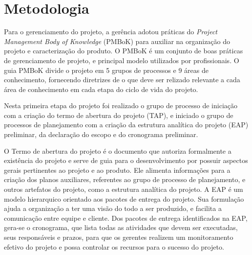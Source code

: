 \section{Metodologia}

  Para o gerenciamento do projeto, a gerência adotou práticas do \textit{Project Management Body of Knowledge}
  (PMBoK) para auxiliar na organização do projeto e caracterização do produto.
  O PMBoK é um conjunto de boas práticas de gerenciamento de projeto, e principal modelo
  utilizados por profissionais. O guia PMBoK divide o projeto em 5 grupos de processos e
  9 áreas de conhecimento, fornecendo diretrizes de o que deve ser relizado relevante
  a cada área de conhecimento em cada etapa do ciclo de vida do projeto.

  Nesta primeira etapa do projeto foi realizado o grupo de
  processo de iniciação com a criação do termo de abertura
  do projeto (TAP), e iniciado o grupo de processos de planejamento
  com a criação da estrutura analítica do projeto (EAP) preliminar, da
  declaração do escopo e do cronograma preliminar.

  O Termo de abertura do projeto é o documento que autoriza formalmente a existência
  do projeto e serve de guia para o desenvolvimento por possuir aspectos gerais
  pertinentes ao projeto e ao produto. Ele alimenta informações para a criação dos planos
   auxiliares, referentes ao grupo de processo de planejamento, e outros artefatos do projeto, como
   a estrutura analítica do projeto.
   A EAP é um modelo hierarquico orientado aos pacotes de entrega do projeto. Sua formulação
   ajuda a organização a ter uma visão do todo a ser produzido, e facilita a comunicação
   entre equipe e cliente. Dos pacotes de entrega identificados na EAP, gera-se o cronograma, que lista
   todas as atividades que devem ser executadas, seus responsáveis e prazos, para que os gerentes realizem
   um monitoramento efetivo do projeto e possa controlar os recursos para o sucesso do projeto.  
